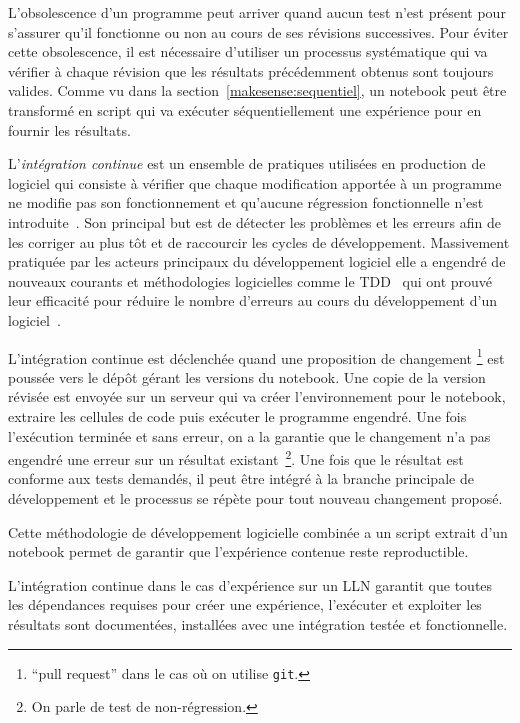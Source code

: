 L'obsolescence d'un programme peut arriver quand aucun test n'est présent pour s'assurer qu'il fonctionne ou non au cours de ses révisions successives.
Pour éviter cette obsolescence, il est nécessaire d'utiliser un processus systématique qui va vérifier à chaque révision que les résultats précédemment obtenus sont toujours valides.
Comme vu dans la section~\ref{makesense:sequentiel}, un notebook peut être transformé en script qui va exécuter séquentiellement une expérience pour en fournir les résultats.

L'\emph{intégration continue} est un ensemble de pratiques utilisées en production de logiciel qui consiste à vérifier que chaque modification apportée à un programme ne modifie pas son fonctionnement et qu'aucune régression fonctionnelle n'est introduite~\cite{duvall2007continuous}.
Son principal but est de détecter les problèmes et les erreurs afin de les corriger au plus tôt et de raccourcir les cycles de développement.
Massivement pratiquée par les acteurs principaux du développement logiciel elle a engendré de nouveaux courants et méthodologies logicielles comme le \ac{TDD}~\cite{beck2003test} qui ont prouvé leur efficacité pour réduire le nombre d'erreurs au cours du développement d'un logiciel~\cite{maximilien2003assessing}. 

L'intégration continue est déclenchée quand une proposition de changement \footnote{``pull request'' dans le cas où on utilise \texttt{git}.} est poussée vers le dépôt gérant les versions du notebook.
Une copie de la version révisée est envoyée sur un serveur qui va créer l'environnement pour le notebook, extraire les cellules de code puis exécuter le programme engendré.
Une fois l'exécution terminée et sans erreur, on a la garantie que le changement n'a pas engendré une erreur sur un résultat existant~\footnote{On parle de test de non-régression.}.
Une fois que le résultat est conforme aux tests demandés, il peut être intégré à la branche principale de développement et le processus se répète pour tout nouveau changement proposé.

Cette méthodologie de développement logicielle combinée a un script extrait d'un notebook permet de garantir que l'expérience contenue reste reproductible.

L'intégration continue dans le cas d'expérience sur un \ac{LLN} garantit que toutes les dépendances requises pour créer une expérience, l'exécuter et exploiter les résultats sont documentées, installées avec une intégration testée et fonctionnelle.

